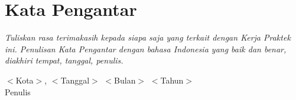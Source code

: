 \chapter*{Kata Pengantar}
\textit{Tuliskan rasa terimakasih kepada siapa saja yang terkait dengan Kerja Praktek ini. Penulisan Kata Pengantar dengan bahasa Indonesia yang baik dan benar, diakhiri tempat, tanggal, penulis.
}

\vspace{10em}
\hspace*{20em} $<$Kota$>$, $<$Tanggal$>$ $<$Bulan$>$ $<$Tahun$>$\\
\hspace*{21.5em} Penulis